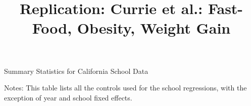 \documentclass[11pt]{article}
\title{Replication: Currie et al.: Fast-Food, Obesity, Weight Gain}
\date{}							%
\begin{document}
\maketitle
\newpage
\begin{table}[H]
\caption{\label{fig: sum_stats} Summary Statistics for California School Data}
\vspace{-0.3cm}

\begin{center}\tiny


\end{center}
\vspace{-0.3cm}
\par
\begin{minipage}{ \linewidth}
\scriptsize{Notes: This table lists all the controls used for the school regressions, with the exception of year and school fixed
effects.}
\end{minipage}

\end{table}
\end{document}
